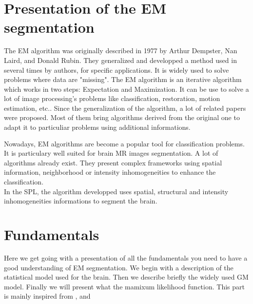\section{Presentation of the EM segmentation}
The EM algorithm was originally described in 1977 by Arthur Dempster, Nan Laird, and Donald Rubin\cite{1}. They generalized and developped a method used in several times by authors, for specific applications. It is widely used to solve problems where data are "missing". %
The EM algorithm is an iterative algorithm which works in two steps: Expectation and Maximization. It can be use to solve a lot of image processing's problems like classification, restoration\cite{3}, motion estimation\cite{2}, etc.. 
Since the generalization of the algorithm, a lot of related papers were proposed. Most of them bring algorithms derived from the original one to adapt it to particuliar problems using additional informations.
\par
Nowadays, EM algorithms are become a popular tool for classification problems.  It is particulary well suited for brain MR images segmentation.
A lot of algorithms already exist. They present complex frameworks using spatial information, neighborhood or intensity inhomogeneities to enhance the classification.\\
In the SPL, the algorithm developped uses spatial, structural and intensity inhomogeneities informations to segment the brain. 
%

\section{Fundamentals}
%
Here we get going with a presentation of all the fundamentals you need to have a good understanding of EM segmentation. We begin with a description of the statistical model used for the brain. Then we describe briefly the widely used GM model. Finally we will present what the mamixum likelihood function. This part is mainly inspired from \cite{4}, \cite{5} and \cite{6}
%
